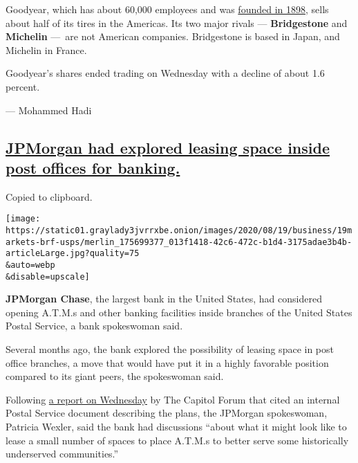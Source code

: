 Goodyear, which has about 60,000 employees and was
\href{https://corporate.goodyear.com/en-US/about/history.html}{founded
in 1898}, sells about half of its tires in the Americas. Its two major
rivals --- \textbf{Bridgestone} and \textbf{Michelin} ---~are not
American companies. Bridgestone is based in Japan, and Michelin in
France.

Goodyear's shares ended trading on Wednesday with a decline of about 1.6
percent.

--- Mohammed Hadi

\hypertarget{jpmorgan-had-explored-leasing-space-inside-post-offices-for-banking}{%
\subsection{\texorpdfstring{\protect\hyperlink{jpmorgan-had-explored-leasing-space-inside-post-offices-for-banking}{JPMorgan
had explored leasing space inside post offices for
banking.}}{JPMorgan had explored leasing space inside post offices for banking.}}\label{jpmorgan-had-explored-leasing-space-inside-post-offices-for-banking}}

Copied to clipboard.

\texttt{[image: https://static01.graylady3jvrrxbe.onion/images/2020/08/19/business/19markets-brf-usps/merlin\_175699377\_013f1418-42c6-472c-b1d4-3175adae3b4b-articleLarge.jpg?quality=75\\\&auto=webp\\\&disable=upscale]}

\textbf{JPMorgan Chase}, the largest bank in the United States, had
considered opening A.T.M.s and other banking facilities inside branches
of the United States Postal Service, a bank spokeswoman said.

Several months ago, the bank explored the possibility of leasing space
in post office branches, a move that would have put it in a highly
favorable position compared to its giant peers, the spokeswoman said.

Following
\href{https://library.thecapitolforum.com/docs/486eya60q0er?vtt=eyJhbGciOiJIUzI1NiIsInR5cCI6IkpXVCJ9.eyJzY29wZSI6InZpZXdUaW1lIiwiaWF0IjoxNTk3ODUyMzQzLCJleHAiOjE1OTgwMjg3NDMsInN1YiI6IjQ4NmV5YTYwcTBlciIsImp0aSI6IjQ4NmV6enhrZGo0OSJ9.S2Supsje_DaQmEA6hsZK7HIHMEL_dMUT4WVLf0z6Ll4\&u=3zu7x0eu4e10}{a
report on Wednesday} by The Capitol Forum that cited an internal Postal
Service document describing the plans, the JPMorgan spokeswoman,
Patricia Wexler, said the bank had discussions ``about what it might
look like to lease a small number of spaces to place A.T.M.s to better
serve some historically underserved communities.''

